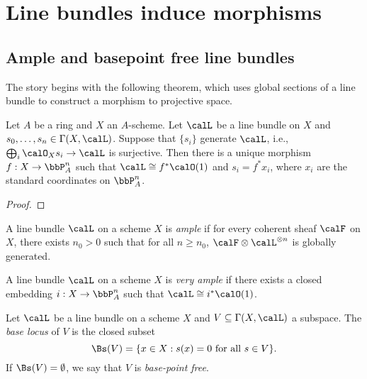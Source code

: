 \section{Line bundles induce morphisms}


\subsection{Ample and basepoint free line bundles}

    The story begins with the following theorem, which uses global sections of a line bundle to construct a morphism to projective space.

    \begin{theorem}\label{thm:morphism_to_projective_space}
        Let \(A\) be a ring and \(X\) an \(A\)-scheme.
        Let \(\calL\) be a line bundle on \(X\) and \(s_0,\ldots,s_n\in\Gamma(X,\calL)\).
        Suppose that \(\{s_i\}\) generate \(\calL\), i.e., \(\bigoplus_i \calO_X s_i \to \calL\) is surjective.
        Then there is a unique morphism \(f:X\to \bbP^n_A\) such that \(\calL\cong f^*\calO(1)\) and \(s_i=f^*x_i\), where \(x_i\) are the standard coordinates on \(\bbP^n_A\).   
    \end{theorem}
    \begin{proof}
    \end{proof}


    \begin{definition}\label{def:ample_line_bundle}
        A line bundle \(\calL\) on a scheme \(X\) is \emph{ample} if for every coherent sheaf \(\calF\) on \(X\), there exists \(n_0>0\) such that for all \(n\ge n_0\), \(\calF\otimes \calL^{\otimes n}\) is globally generated.
    \end{definition}

    \begin{definition}\label{def:very_ample_line_bundle}
        A line bundle \(\calL\) on a scheme \(X\) is \emph{very ample} if there exists a closed embedding \(i:X\to \bbP^n_A\) such that \(\calL\cong i^*\calO(1)\).
    \end{definition}

    \begin{definition}\label{def:base_locus}
        Let \(\calL\) be a line bundle on a scheme \(X\) and \(V\subseteq \Gamma(X,\calL)\) a subspace.
        The \emph{base locus} of \(V\) is the closed subset
        \[
            \Bs(V) = \{x\in X : s(x)=0 \text{ for all } s\in V\}.
        \]
        If \(\Bs(V)=\emptyset\), we say that \(V\) is \emph{base-point free}.
    \end{definition}

